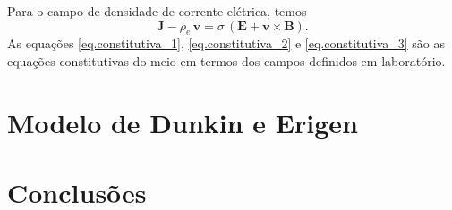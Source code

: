 Para o campo de densidade de corrente el\'etrica, temos
\begin{equation}\label{eq.constitutiva_3}
\mathbf{J}-\rho_e\,\mathbf{v}=\sigma\,(\mathbf{E}+\mathbf{v}\times\mathbf{B}).
\end{equation}
As equa\c{c}\~oes \ref{eq.constitutiva_1}, \ref{eq.constitutiva_2} e \ref{eq.constitutiva_3} s\~ao as equa\c{c}\~oes constitutivas do meio em termos dos campos definidos em laborat\'orio. 


\section{Modelo de Dunkin e Erigen}






\section{Conclusões}
